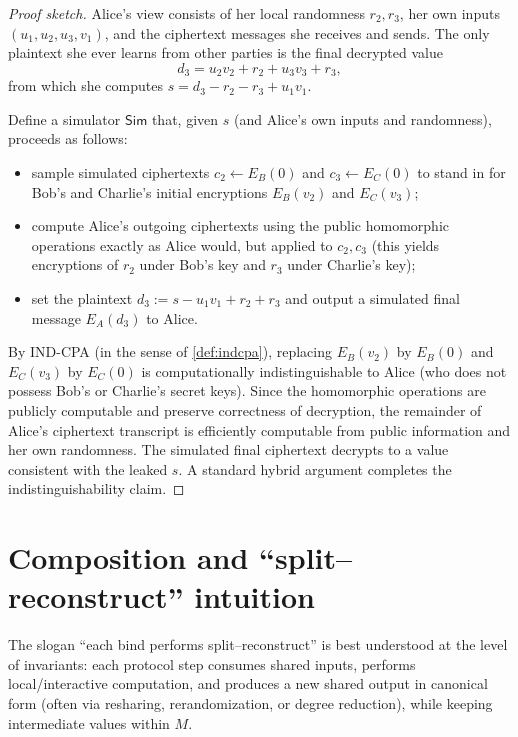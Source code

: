 \documentclass[11pt,a4paper]{article}
\theoremstyle{definition}
\theoremstyle{remark}
\begin{document}
\begin{proof}[Proof sketch]
Alice's view consists of her local randomness \(r_2,r_3\), her own inputs \((u_1,u_2,u_3,v_1)\), and the ciphertext messages she receives and sends. The only plaintext she ever learns from other parties is the final decrypted value
\[
d_3 = u_2 v_2 + r_2 + u_3 v_3 + r_3,
\]
from which she computes \(s = d_3 - r_2 - r_3 + u_1 v_1\).

Define a simulator \(\mathsf{Sim}\) that, given \(s\) (and Alice's own inputs and randomness), proceeds as follows:
\begin{itemize}[leftmargin=2em]
  \item sample simulated ciphertexts \(c_2 \leftarrow E_B(0)\) and \(c_3 \leftarrow E_C(0)\) to stand in for Bob's and Charlie's initial encryptions \(E_B(v_2)\) and \(E_C(v_3)\);
  \item compute Alice's outgoing ciphertexts using the public homomorphic operations exactly as Alice would, but applied to \(c_2,c_3\) (this yields encryptions of \(r_2\) under Bob's key and \(r_3\) under Charlie's key);
  \item set the plaintext \(d_3 := s - u_1 v_1 + r_2 + r_3\) and output a simulated final message \(E_A(d_3)\) to Alice.
\end{itemize}
By IND-CPA (in the sense of \cref{def:indcpa}), replacing \(E_B(v_2)\) by \(E_B(0)\) and \(E_C(v_3)\) by \(E_C(0)\) is computationally indistinguishable to Alice (who does not possess Bob's or Charlie's secret keys). Since the homomorphic operations are publicly computable and preserve correctness of decryption, the remainder of Alice's ciphertext transcript is efficiently computable from public information and her own randomness. The simulated final ciphertext decrypts to a value consistent with the leaked \(s\). A standard hybrid argument completes the indistinguishability claim.
\end{proof}

\section{Composition and ``split--reconstruct'' intuition}
\label{sec:composition}

The slogan ``each bind performs split--reconstruct'' is best understood at the level of invariants: each protocol step consumes shared inputs, performs local/interactive computation, and produces a new shared output in canonical form (often via resharing, rerandomization, or degree reduction), while keeping intermediate values within \(M\).
\end{document}
